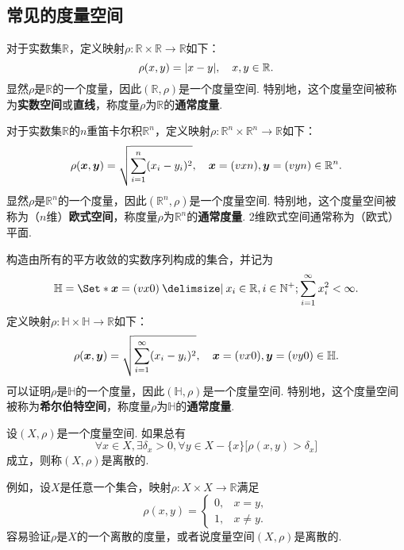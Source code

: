 \subsection{常见的度量空间}
\begin{example}
对于实数集\(\mathbb{R}\)，定义映射\(\rho\colon\mathbb{R}\times\mathbb{R}\to\mathbb{R}\)如下：\[
\rho(x,y) = \abs{x-y},
\quad x,y\in\mathbb{R}.
\]显然\(\rho\)是\(\mathbb{R}\)的一个度量，因此\((\mathbb{R},\rho)\)是一个度量空间.
特别地，这个度量空间被称为\textbf{实数空间}或\textbf{直线}，称度量\(\rho\)为\(\mathbb{R}\)的\textbf{通常度量}.
\end{example}

\begin{example}
对于实数集\(\mathbb{R}\)的\(n\)重笛卡尔积\(\mathbb{R}^n\)，定义映射\(\rho\colon\mathbb{R}^n\times\mathbb{R}^n\to\mathbb{R}\)如下：\[
\rho(\boldsymbol{x},\boldsymbol{y}) = \sqrt{\sum\limits_{i=1}^n (x_i-y_i)^2},
\quad \boldsymbol{x}=(v{x}{n}),\boldsymbol{y}=(v{y}{n})\in\mathbb{R}^n.
\]显然\(\rho\)是\(\mathbb{R}^n\)的一个度量，因此\((\mathbb{R}^n,\rho)\)是一个度量空间.
特别地，这个度量空间被称为（\(n\)维）\textbf{欧式空间}，称度量\(\rho\)为\(\mathbb{R}^n\)的\textbf{通常度量}.
2维欧式空间通常称为（欧式）平面.
\end{example}

\begin{example}
构造由所有的平方收敛的实数序列构成的集合，并记为\[
\mathbb{H}
= \Set*{
\mat{x}=(\v{x}{0})
\given
x_i\in\mathbb{R},
i\in\mathbb{N}^+;
\sum\limits_{i=1}^{\infty} x_i^2<\infty
}.
\]定义映射\(\rho\colon\mathbb{H}\times\mathbb{H}\to\mathbb{R}\)如下：\[
\rho(\boldsymbol{x},\boldsymbol{y}) = \sqrt{\sum\limits_{i=1}^{\infty} (x_i-y_i)^2},
\quad \boldsymbol{x}=(v{x}{0}),\boldsymbol{y}=(v{y}{0})\in\mathbb{H}.
\]可以证明\(\rho\)是\(\mathbb{H}\)的一个度量，因此\((\mathbb{H},\rho)\)是一个度量空间.
特别地，这个度量空间被称为\textbf{希尔伯特空间}，称度量\(\rho\)为\(\mathbb{H}\)的\textbf{通常度量}.
\end{example}

\begin{example}[离散度量空间]
设\((X,\rho)\)是一个度量空间.
如果总有\[
\forall x \in X,
\exists \delta_x > 0,
\forall y \in X - \{x\}
\bigl[
\rho(x,y) > \delta_x
\bigr]
\]成立，则称\((X,\rho)\)是离散的.

例如，设\(X\)是任意一个集合，映射\(\rho\colon X \times X\to\mathbb{R}\)满足\[
\rho(x,y) = \left\{ \begin{array}{ll}
0, & x=y, \\
1, & x\neq y.
\end{array} \right.
\]容易验证\(\rho\)是\(X\)的一个离散的度量，或者说度量空间\((X,\rho)\)是离散的.
\end{example}

